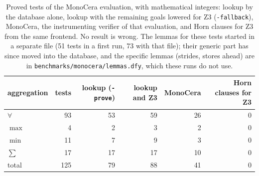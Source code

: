 \begin{table}[t]
\centering\small
\begin{tabular}{@{}lrrrrr@{}}
\toprule
aggregation & tests & lookup (\texttt{-prove}) & lookup and Z3 & MonoCera & Horn clauses for Z3 \\
\midrule
$\forall$ & 93 & 53 & 59 & 26 & 0 \\
$\max$ & 4 & 2 & 3 & 2 & 0 \\
$\min$ & 11 & 7 & 9 & 3 & 0 \\
$\sum$ & 17 & 17 & 17 & 10 & 0 \\
\midrule
total & 125 & 79 & 88 & 41 & 0 \\
\bottomrule
\end{tabular}
\caption{Proved tests of the MonoCera evaluation, with mathematical integers: lookup by the database alone, lookup with
the remaining goals lowered for Z3 (\texttt{-fallback}), MonoCera, the instrumenting verifier of that evaluation, and
Horn clauses for Z3 from the same frontend. No result is wrong. The lemmas for these tests started in a separate file
(51 tests in a first run, 73 with that file); their generic part has since moved into the database, and the
specific lemmas (strides, stores ahead) are in \texttt{benchmarks/monocera/lemmas.dfy}, which these runs do not
use.}\label{tab:monocera}
\end{table}
